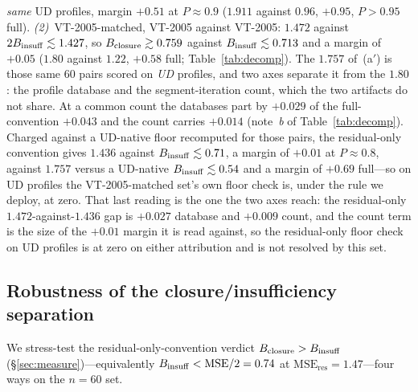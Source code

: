 \emph{same} UD profiles, margin $+0.51$ at $P\approx0.9$ ($1.911$ against $0.96$, $+0.95$, $P>0.95$
full). \emph{(2)}~VT-2005-matched, VT-2005 against VT-2005: $1.472$ against $2B_{\mathrm{insuff}}\lesssim1.427$, so
$B_{\mathrm{closure}}\gtrsim0.759$ against $B_{\mathrm{insuff}}\lesssim0.713$ and a margin of
$+0.05$ ($1.80$ against $1.22$, $+0.58$ full; Table~\ref{tab:decomp}). The $1.757$ of~(a$'$) is those
same $60$ pairs scored on \emph{UD} profiles, and two axes separate it from the $1.80$: the profile
database and the segment-iteration count, which the two artifacts do not share. At a common count the
databases part by $+0.029$ of the full-convention $+0.043$ and the count carries $+0.014$
(note~\emph{b} of Table~\ref{tab:decomp}). Charged against a UD-native floor recomputed for those pairs, the residual-only convention gives
$1.436$ against $B_{\mathrm{insuff}}\lesssim0.71$, a margin of $+0.01$ at $P\approx0.8$, against $1.757$ versus a
UD-native $B_{\mathrm{insuff}}\lesssim0.54$ and a margin of $+0.69$ full---so on UD profiles the VT-2005-matched set's own
floor check is, under the rule we deploy, at zero. That last reading is the one the two axes reach:
the residual-only $1.472$-against-$1.436$ gap is $+0.027$ database and $+0.009$ count, and the count
term is the size of the $+0.01$ margin it is read against, so the residual-only floor check on UD
profiles is at zero on either attribution and is not resolved by this set.

\subsection{Robustness of the closure/insufficiency separation}
\label{sec:si-robustness}
We stress-test the residual-only-convention verdict
$B_{\mathrm{closure}}>B_{\mathrm{insuff}}$ (\S\ref{sec:measure})---equivalently $B_{\mathrm{insuff}}<\mathrm{MSE}/2=0.74$ at
$\mathrm{MSE}_{\mathrm{res}}=1.47$---four ways on the $n{=}60$ set.

